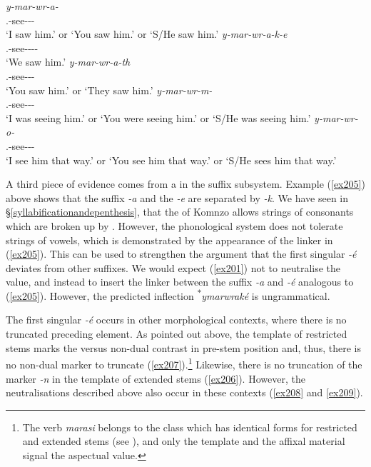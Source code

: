 \begin{exe}
\ex
\begin{xlist}
	\ex
	\gll \emph{y-mar-wr-a-\Zero{}}\\
	\Tsg.\Masc-see-\Ndu-\Pst-\Sg\\
	\trans `I saw him.' or `You saw him.' or `S/He saw him.'
	\label{ex201}
	\ex
	\gll \emph{y-mar-wr-a-k-e}\\
	\Tsg.\Masc-see-\Ndu-\Pst-\Lk-\Fnsg\\
	\trans `We saw him.'
	\label{ex205}
	\ex
	\gll \emph{y-mar-wr-a-th}\\
	\Tsg.\Masc-see-\Ndu-\Pst-\Stnsg\\
	\trans `You saw him.' or `They saw him.'
	\label{ex203}
	\ex
	\gll \emph{y-mar-wr-m-\Zero{}}\\
	\Tsg.\Masc-see-\Ndu-\Dur-\Sg\\
	\trans `I was seeing him.' or `You were seeing him.' or `S/He was seeing him.'
	\label{ex202}
	\ex
	\gll \emph{y-mar-wr-o-\Zero{}}\\
	\Tsg.\Masc-see-\Ndu-\Andat-\Sg\\
	\trans `I see him that way.' or `You see him that way.' or `S/He sees him that way.'
	\label{ex214}
\end{xlist}
\end{exe}

A third piece of evidence comes from a  in the suffix subsystem. Example (\ref{ex205}) above shows that the  suffix \emph{-a} and the \Fnsg{} \emph{-e} are separated by \emph{-k}. We have seen in \S{}\ref{syllabificationandepenthesis}, that the  of Komnzo allows strings of consonants which are broken up by . However, the phonological system does not tolerate strings of vowels, which is demonstrated by the appearance of the linker in (\ref{ex205}). This can be used to strengthen the argument that the first singular \emph{-é} deviates from other suffixes. We would expect (\ref{ex201}) not to neutralise the  value, and instead to insert the linker between the  suffix \emph{-a} and \emph{-é} analogous to (\ref{ex205}). However, the predicted inflection \textsuperscript{$\ast$}\emph{ymarwraké} is ungrammatical.%

The first singular \emph{-é} occurs in other morphological contexts, where there is no truncated preceding element. As pointed out above, the template of restricted stems marks the  versus non-dual contrast in pre-stem position and, thus, there is no non-dual marker to truncate (\ref{ex207}).\footnote{The verb \emph{marasi} belongs to the class which has identical forms for restricted and extended stems (see ), and only the template and the affixal material signal the aspectual value.} Likewise, there is no truncation of the  marker \emph{-n} in the template of extended stems (\ref{ex206}). However, the  neutralisations described above also occur in these contexts (\ref{ex208} and \ref{ex209}).

